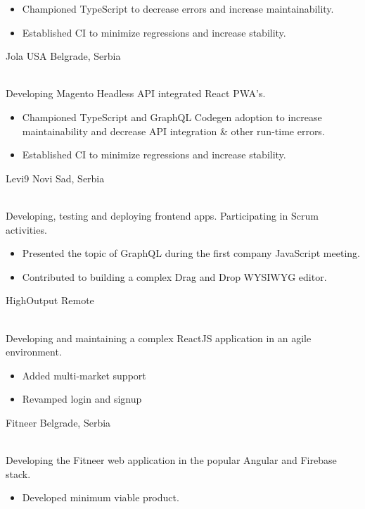 \documentclass[]{cv-style}          %
\begin{document}
\begin{entrylist}
{\begin{itemize}
      \item Championed TypeScript to decrease errors and increase maintainability.
      \item Established CI to minimize regressions and increase stability.
    \end{itemize}}
  \entry
  {}
  {Jola USA}
  {Belgrade, Serbia}
  {\\
    Developing Magento Headless API integrated React PWA's.\\
    \subtitle{Detailed achievements:}
    \begin{itemize}
      \item Championed TypeScript and GraphQL Codegen adoption to increase maintainability and decrease API integration \& other run-time errors.
      \item Established CI to minimize regressions and increase stability.
    \end{itemize}}
  \entry
  {}
  {Levi9}
  {Novi Sad, Serbia}
  {\\
    Developing, testing and deploying frontend apps. Participating in Scrum activities.\\
    \subtitle{Detailed achievements:}
    \begin{itemize}
      \item Presented the topic of GraphQL during the first company JavaScript meeting.
      \item Contributed to building a complex Drag and Drop WYSIWYG editor.
    \end{itemize}}
  \entry
  {}
  {HighOutput}
  {Remote}
  {\\
    Developing and maintaining a complex ReactJS application in an agile environment.\\
    \subtitle{Detailed achievements:}
    \begin{itemize}
      \item Added multi-market support
      \item Revamped login and signup
    \end{itemize}}
  \entry
  {}
  {Fitneer}
  {Belgrade, Serbia}
  {\\
    Developing the Fitneer web application in the popular Angular and Firebase stack.\\
    \subtitle{Detailed achievements:}
    \begin{itemize}
      \item Developed minimum viable product.
    \end{itemize}}

\end{entrylist}
\end{document}
